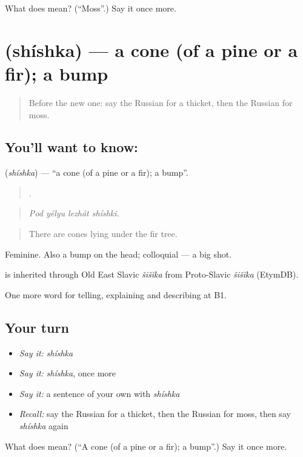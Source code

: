 \begin{tcolorbox}[breakable,colback=teal!4,colframe=teal!35!black,title={Before you move on}]
What does  mean? (\textquotedblleft{}Moss\textquotedblright{}.) Say it once more.
\end{tcolorbox}
\section[\texorpdfstring{\ru{шишка} (shíshka)}{шишка (shíshka)}]{ (shíshka) — a cone (of a pine or a fir); a bump}

\label{lesson:RU-C461-shishka}



\begin{quote}
Before the new one: say the Russian for a thicket, then the Russian for moss.
\end{quote}

\subsection*{You'll want to know: }
\textbf{} (\emph{shíshka}) — \textquotedblleft{}a cone (of a pine or a fir); a bump\textquotedblright{}.

\begin{quote}
   .
\end{quote}

\begin{quote}
\emph{Pod yélyu lezhát shíshki.}
\end{quote}

\begin{quote}
There are cones lying under the fir tree.
\end{quote}

Feminine. Also a bump on the head; colloquial \emph{ } — a big shot.

\begin{cousinweb}
\emph{} is inherited through Old East Slavic \emph{šišĭka} from Proto-Slavic \emph{šišĭka} (EtymDB).
\end{cousinweb}

\begin{grammarlens}[title={What you've built}]
One more word for telling, explaining and describing at B1.
\end{grammarlens}

\subsection*{Your turn}
\begin{itemize}
\raggedright
  \item \emph{Say it:} \emph{shíshka}
  \item \emph{Say it:} \emph{shíshka}, once more
  \item \emph{Say it:} a sentence of your own with \emph{shíshka}
  \item \emph{Recall:} say the Russian for a thicket, then the Russian for moss, then say \emph{shíshka} again
\end{itemize}

\begin{tcolorbox}[breakable,colback=teal!4,colframe=teal!35!black,title={Before you move on}]
What does  mean? (\textquotedblleft{}A cone (of a pine or a fir); a bump\textquotedblright{}.) Say it once more.
\end{tcolorbox}
